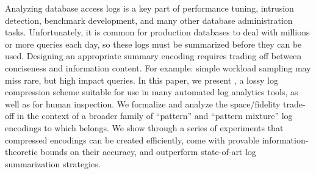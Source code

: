 Analyzing database access logs is a key part of performance tuning, intrusion detection, benchmark development, and many other database administration tasks.
Unfortunately, it is common for production databases to deal with millions or more queries each day, so these logs must be summarized before they can be used.
Designing an appropriate summary encoding requires trading off between conciseness and information content.
For example: simple workload sampling may miss rare, but high impact queries.
In this paper, we present \systemname, a lossy log compression scheme suitable for use in many automated log analytics tools, as well as for human inspection.
We formalize and analyze the space/fidelity trade-off in the context of a broader family of ``pattern'' and ``pattern mixture'' log encodings to which \systemname belongs.
We show through a series of experiments that \systemname compressed encodings can be created efficiently, come with provable information-theoretic bounds on their accuracy, and outperform state-of-art log summarization strategies.
